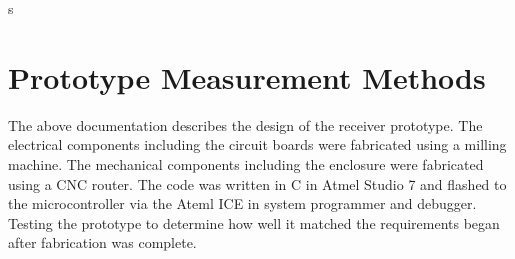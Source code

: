\documentclass{article}
\begin{document}
s%


% 
% 


\section{Prototype Measurement Methods}
	The above documentation describes the design of the receiver prototype.  The electrical components including the circuit boards were fabricated using a milling machine.  The mechanical components including the enclosure were fabricated using a CNC router.  The code was written in C in Atmel Studio 7 and flashed to the microcontroller via the Ateml ICE in system programmer and debugger.  Testing the prototype to determine how well it matched the requirements began after fabrication was complete.
\end{document}
